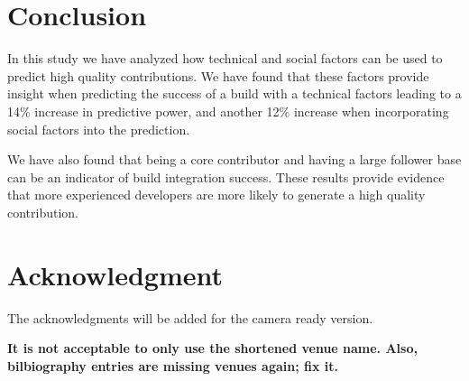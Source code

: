 \documentclass[10pt, conference]{IEEEtran}
\newcommand{\todo}[1]
  {{\scriptsize \textbf{\color{red} {#1}}}}
\begin{document}
\section{Conclusion}
In this study we have analyzed how technical and social factors can be used to
predict high quality contributions.  We have found that these factors provide
insight when predicting the success of a build with a technical factors leading
to a 14\% increase in predictive power, and another 12\% increase when
incorporating social factors into the prediction.

We have also found that being a core contributor and having a large follower
base can be an indicator of build integration success.
These results provide evidence that more experienced
developers are more likely to generate a high quality contribution.


\section*{Acknowledgment}

The acknowledgments will be added for the camera ready version.




%
%
%

\todo{It is not acceptable to only use the shortened venue name.  Also, bilbiography entries are missing venues again; fix it.}





\end{document}
